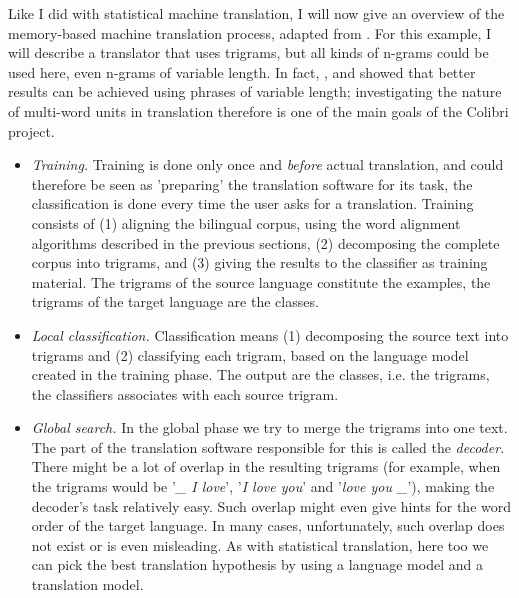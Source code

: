\documentclass[12pt]{article}
\begin{document}
Like I did with statistical machine translation, I will now give an overview of the memory-based machine translation process, adapted from \citet{vdbb09}. For this example, I will describe a translator that uses trigrams, but all kinds of n-grams could be used here, even n-grams of variable length. In fact, \citet{vangompel09}, \citet{vangompelea09} and \citet{vangompel11} showed that better results can be achieved using phrases of variable length; investigating the nature of multi-word units in translation therefore is one of the main goals of the Colibri project.

\begin{itemize}
\item \emph{Training.} Training is done only once and \emph{before} actual translation, and could therefore be seen as 'preparing' the translation software for its task, the classification is done every time the user asks for a translation. Training consists of (1) aligning the bilingual corpus, using the word alignment algorithms described in the previous sections, (2) decomposing the complete corpus into trigrams, and (3) giving the results to the classifier as training material. The trigrams of the source language constitute the examples, the trigrams of the target language are the classes.

\item \emph{Local classification.} Classification means (1) decomposing the source text into trigrams and (2) classifying each trigram, based on the language model created in the training phase. The output are the classes, i.e. the trigrams, the classifiers associates with each source trigram.

\item \emph{Global search.} In the global phase we try to merge the trigrams into one text. The part of the translation software responsible for this is called the \emph{decoder}. There might be a lot of overlap in the resulting trigrams (for example, when the trigrams would be '\emph{\_ I love}', '\emph{I love you}' and '\emph{love you \_}'), making the decoder's task relatively easy. Such overlap might even give hints for the word order of the target language. In many cases, unfortunately, such overlap does not exist or is even misleading. As with statistical translation, here too we can pick the best translation hypothesis by using a language model and a translation model. 


\end{itemize}
\end{document}
